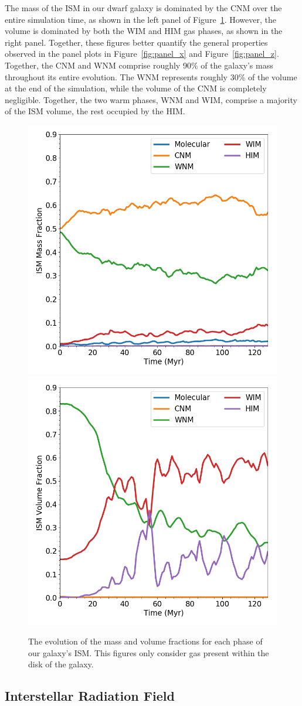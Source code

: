 \documentclass[twocolumn]{aastex61}
\begin{document}
The mass of the ISM in our dwarf galaxy is dominated by the CNM over the entire simulation time, as shown in the left panel of Figure~\ref{fig:ISM_evolution}. However, the volume is dominated by both the WIM and HIM gas phases, as shown in the right panel. Together, these figures better quantify the general properties observed in the panel plots in Figure~\ref{fig:panel_x} and Figure~\ref{fig:panel_z}. Together, the CNM and WNM comprise roughly 90\% of the galaxy's mass throughout its entire evolution. The WNM represents roughly 30\% of the volume at the end of the simulation, while the volume of the CNM is completely negligible. Together, the two warm phases, WNM and WIM, comprise a majority of the ISM volume, the rest occupied by the HIM. 

\begin{figure}
\centering
\includegraphics[width=0.45\linewidth]{mass_fraction_evolution.png}
\includegraphics[width=0.45\linewidth]{volume_fraction_evolution.png}
\caption{The evolution of the mass and volume fractions for each phase of our galaxy's ISM. This figures only consider gas present within the disk of the galaxy.}
\label{fig:ISM_evolution}
\end{figure}

\subsection{Interstellar Radiation Field}
\label{sec:ISRF}
\end{document}
